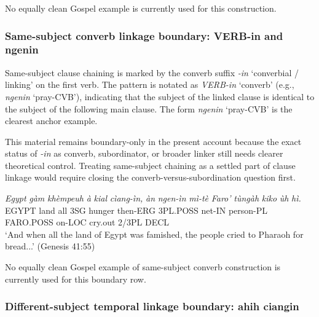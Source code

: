 \documentclass[
  11pt,
  a4paper,
]{article}
\newcommand{\tdim}[1]{\textit{#1}}
\newcommand{\tdimword}[1]{\textit{#1}}
\renewcommand{\textsc}[1]{{\footnotesize\MakeUppercase{#1}}}
\newcommand{\glossquote}[1]{`#1'}
\begin{document}
No equally clean Gospel example is currently used for this construction.

\subsubsection{Same-subject converb linkage boundary: VERB-in and
ngenin}\label{same-subject-converb-linkage-boundary-verb-in-and-ngenin}

Same-subject clause chaining is marked by the converb suffix \tdim{-in}
\glossquote{converbial / linking} on the first verb. The pattern is
notated as \tdim{VERB-in} \glossquote{converb} (e.g., \tdim{ngenin}
\glossquote{pray-CVB}), indicating that the subject of the linked clause
is identical to the subject of the following main clause. The form
\tdim{ngenin} \glossquote{pray-CVB} is the clearest anchor example.

This material remains boundary-only in the present account because the
exact status of \tdim{-in} as converb, subordinator, or broader linker
still needs clearer theoretical control. Treating same-subject chaining
as a settled part of clause linkage would require closing the
converb-versus-subordination question first.

\begin{exe}
\ex \label{ex:clause-ngenin-gen41p55}
\gll \tdimword{Egypt} \tdimword{gàm} \tdimword{khèmpeuh} \tdimword{à} \tdimword{kial} \tdimword{cìang-ìn,} \tdimword{àn} \tdimword{ngen-ìn} \tdimword{mì-tè} \tdimword{Faro'} \tdimword{tùngàh} \tdimword{kiko} \tdimword{ùh} \tdimword{hì.} \\
     \textsc{egypt} land all \textsc{3sg} hunger then-\textsc{erg} \textsc{3pl}.\textsc{poss} net-\textsc{in} person-\textsc{pl} \textsc{faro}.\textsc{poss} on-\textsc{loc} cry.out 2/3PL \textsc{decl} \\
\glt \glossquote{And when all the land of Egypt was famished, the people cried to Pharaoh for bread...} (Genesis 41:55)
\end{exe}

No equally clean Gospel example of same-subject converb construction is
currently used for this boundary row.

\subsubsection{Different-subject temporal linkage boundary: ahih
ciangin}\label{different-subject-temporal-linkage-boundary-ahih-ciangin}
\end{document}

